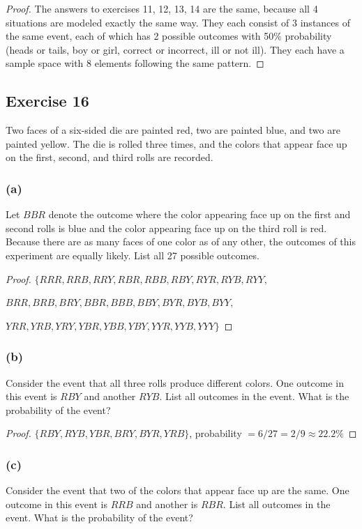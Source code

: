 \documentclass[14pt]{extarticle}
\begin{document}
\begin{proof}
     The answers to exercises 11, 12, 13, 14 are the same, because all 4 situations are modeled exactly the same way.
     They each consist of 3 instances of the same event, each of which has 2 possible outcomes with 50\% probability (heads
     or tails, boy or girl, correct or incorrect, ill or not ill). They each have a sample space with 8 elements
     following the same pattern.
\end{proof}

\subsection{Exercise 16}
Two faces of a six-sided die are painted red, two are painted blue, and two are painted yellow. The die is rolled
three times, and the colors that appear face up on the first, second, and third rolls are recorded.


\subsubsection{(a)}
Let \(BBR\) denote the outcome where the color appearing face up on the first and second rolls is blue and the color
appearing face up on the third roll is red. Because there are as many faces of one color as of any other, the
outcomes of this experiment are equally likely. List all 27 possible outcomes.

\begin{proof}
     \(\{RRR, RRB, RRY, RBR, RBB, RBY, RYR, RYB, RYY,\)

     \(BRR, BRB, BRY, BBR, BBB, BBY, BYR, BYB, BYY,\)

     \(YRR, YRB, YRY, YBR, YBB, YBY, YYR, YYB, YYY\}\)
\end{proof}

\subsubsection{(b)}
Consider the event that all three rolls produce different colors. One outcome in this event is \(RBY\) and another
\(RYB\). List all outcomes in the event. What is the probability of the event?

\begin{proof}
     \(\{RBY, RYB, YBR, BRY, BYR, YRB\}\), probability \(= 6/27 = 2/9 \approx 22.2\%\)
\end{proof}

\subsubsection{(c)}
Consider the event that two of the colors that appear face up are the same. One outcome in this event is \(RRB\) and
another is \(RBR\). List all outcomes in the event. What is the probability of the event?
\end{document}
